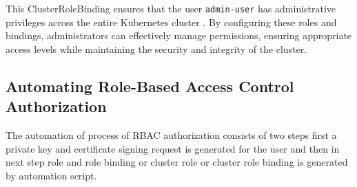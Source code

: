
This ClusterRoleBinding ensures that the user \texttt{admin-user} has administrative privileges across the entire Kubernetes cluster . By configuring these roles and bindings, administrators can effectively manage permissions, ensuring appropriate access levels while maintaining the security and integrity of the cluster. \cite{Kubernetes_doc}

\subsection{Automating Role-Based Access Control Authorization}

The automation of process of RBAC authorization consists of two steps first a private key and certificate signing request  is generated for the user and then in next step role and role binding or cluster role or cluster role binding is generated by automation script. \cite{Kubernetes_doc}

